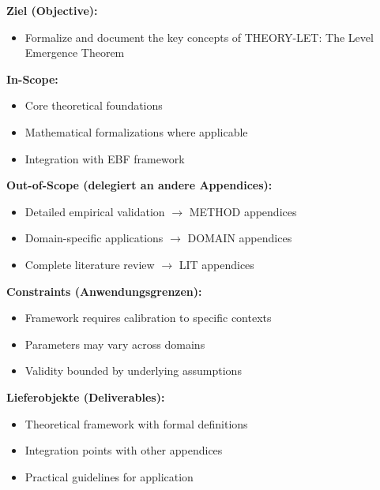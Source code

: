 \begin{tcolorbox}[
    colback=orange!5!white,
    colframe=orange!75!black,
    title={\textbf{Appendix Scope: Ziel / In-Scope / Out-of-Scope / Constraints}},
    fonttitle=\bfseries
]

\textbf{Ziel (Objective):}
\begin{itemize}[nosep]
    \item Formalize and document the key concepts of THEORY-LET: The Level Emergence Theorem
\end{itemize}

\textbf{In-Scope:}
\begin{itemize}[nosep]
    \item Core theoretical foundations
    \item Mathematical formalizations where applicable
    \item Integration with EBF framework
\end{itemize}

\textbf{Out-of-Scope (delegiert an andere Appendices):}
\begin{itemize}[nosep]
    \item Detailed empirical validation $\rightarrow$ METHOD appendices
    \item Domain-specific applications $\rightarrow$ DOMAIN appendices
    \item Complete literature review $\rightarrow$ LIT appendices
\end{itemize}

\textbf{Constraints (Anwendungsgrenzen):}
\begin{itemize}[nosep]
    \item Framework requires calibration to specific contexts
    \item Parameters may vary across domains
    \item Validity bounded by underlying assumptions
\end{itemize}

\textbf{Lieferobjekte (Deliverables):}
\begin{itemize}[nosep]
    \item Theoretical framework with formal definitions
    \item Integration points with other appendices
    \item Practical guidelines for application
\end{itemize}

\end{tcolorbox}

